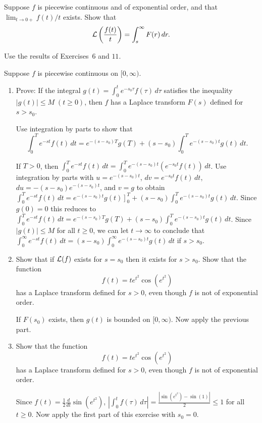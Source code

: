 \documentclass{ximera}
\begin{document}
\begin{problem}\label{exer:8.1.13}
Suppose $f$ is piecewise continuous and of exponential
order, and that $\lim_{t\to 0+} f(t)/t$ exists.  Show that
$$
{\cal L}\left(\frac{f(t)}{t}\right)=\int^\infty_s F(r)\,dr.
$$
\begin{hint}
    Use  the results of Exercises~$6$ and $11$.
\end{hint}
\end{problem}

\begin{problem}\label{exer:8.1.14}
Suppose $f$ is piecewise continuous on $[0,\infty)$.
\begin{enumerate}
\item %
Prove: If the integral $g(t)=\int^t_0 e^{-s_0\tau} f(\tau)\,d\tau$
satisfies the inequality $|g(t)|\le M\; (t\ge 0)$, then $f$ has a
Laplace transform $F(s)$ defined for $s>s_0$.

\begin{hint}
Use integration by
parts to show that
$$
\int_0^T e^{-st}f(t)\,dt = e^{-(s-s_0)T}g(T)
+(s-s_0)\int_0^Te^{-(s-s_0)t}g(t)\,dt.
$$
\end{hint}

\begin{solution}
If $T>0$, then
$\int_0^Te^{-st}f(t)\,dt=\int_0^Te^{-(s-s_0)t}(e^{-s_0t}f(t))\,dt$.
Use integration by parts with $u=e^{-(s-s_0)t}$,
$dv=e^{-s_0t}f(t)\,dt$, $du=-(s-s_0)e^{-(s-s_0)t}$, and $v=g$ to obtain
$\int_0^T e^{-st}f(t)\,dt = e^{-(s-s_0)t}g(t)\left. \right]_0^T
+(s-s_0)\int_0^Te^{-(s-s_0)t}g(t)\,dt$. Since $g(0)=0$ this reduces to
$\int_0^T e^{-st}f(t)\,dt = e^{-(s-s_0)T}g(T)
+(s-s_0)\int_0^Te^{-(s-s_0)t}g(t)\,dt$. Since $|g(t)|\le M$ for all
$t\ge0$, we can let $t\to\infty$ to conclude that $\int_0^\infty
e^{-st}f(t)\,dt = (s-s_0)\int_0^\infty e^{-(s-s_0)t}g(t)\,dt$ if
$s>s_0$.
\end{solution}

\item %
 Show that if ${\cal L}(f)$ exists for
$s=s_0$ then it exists for $s>s_0$.
Show that the function
$$
f(t)=te^{t^2}\cos(e^{t^2})
$$
has a Laplace transform defined for $s>0$, even though $f$ is not of exponential order.

\begin{solution}
If $F(s_0)$ exists, then $g(t)$ is bounded on $[0,\infty)$.
Now apply the previous part.
\end{solution}

\item %
Show that the function
$$
f(t)=te^{t^2}\cos(e^{t^2})
$$
has a Laplace transform defined for $s>0$, even though $f$ is not of exponential order.

\begin{solution}
Since  $f(t)=\frac{1}{2}\frac{d}{dt}\sin(e^{t^2})$,
$\left|\int_0^tf(\tau)\,d\tau\right|=\frac{|\sin(e^{t^2})-\sin(1)|}{2}\le1$
for all $t\ge0$. Now apply the first part of this exercise with $s_0=0$.
\end{solution}
\end{enumerate}
\end{problem}
\end{document}
